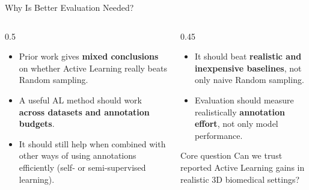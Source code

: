 \documentclass[aspectratio=169,11pt]{beamer}
\begin{document}
\begin{frame}{Why Is Better Evaluation Needed?}

\begin{columns}[T]

\begin{column}{0.5\textwidth}
\begin{itemize}
    \item Prior work gives \textbf{mixed conclusions} on whether Active Learning really beats Random sampling.
    \item A useful AL method should work \textbf{across datasets and annotation budgets}.
    \item It should still help when combined with other ways of using annotations efficiently (self- or semi-supervised learning).
\end{itemize}
\end{column}

\begin{column}{0.45\textwidth}
\begin{itemize}
    \item It should beat \textbf{realistic and inexpensive baselines}, not only naive Random sampling.
    \item Evaluation should measure realistically \textbf{annotation effort}, not only model performance.
\end{itemize}

\vspace{0.3cm}

\begin{block}{Core question}
Can we trust reported Active Learning gains in realistic 3D biomedical settings?
\end{block}

\end{column}

\end{columns}

\end{frame}
\end{document}
